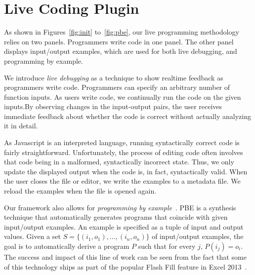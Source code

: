 \vspace{-8pt}
\section{Live Coding Plugin}
As shown in Figures~\ref{fig:init} to~\ref{fig:pbe}, our live programming methodology
relies on two panels.
Programmers write code in one panel.
The other panel displays input/output examples,
which are used for both live debugging,
and programming by example.

We introduce \textit{live debugging} as a technique to show realtime feedback as programmers write code.
Programmers can specify an arbitrary number of function inputs.
As users write code, we continually run the code on the given inputs.By observing changes in the input-output pairs,
the user receives immediate feedback about whether the code is correct without actually analyzing it in detail.

As Javascript is an interpreted language, running syntactically correct code is fairly straightforward.
Unfortunately, the process of editing code often involves that code
being in a malformed, syntactically incorrect state.
Thus, we only update the displayed output when the code is, in fact,
syntactically valid.
When the user closes the file or editor,
we write the examples to a metadata file.
We reload the examples when the file is opened again.

Our framework also allows for \textit{programming by example}~\cite{cypher1991eager,cypher93,lieberman01,synasc12}.
PBE  is a synthesis technique that automatically generates programs that coincide with given input/output examples. An example is specified as a tuple of input and output values. Given a set $S= \{(i_1, o_1),\ldots, (i_n, o_n)\}$ of input/output examples, the goal is to automatically derive a program $P$ such that for every $j$, $P(i_j) = o_i$. The success and impact of this line of work can be seen from the fact that some of this technology ships as part of the popular Flash Fill feature in Excel 2013~\cite{flashFillPOPL}.

